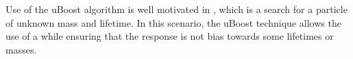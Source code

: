 Use of the uBoost algorithm is well motivated in , which is a search for a particle
of unknown mass and lifetime.
In this scenario, the uBoost technique allows the use of a \BDT while ensuring that the response is
not bias towards some lifetimes or masses.













